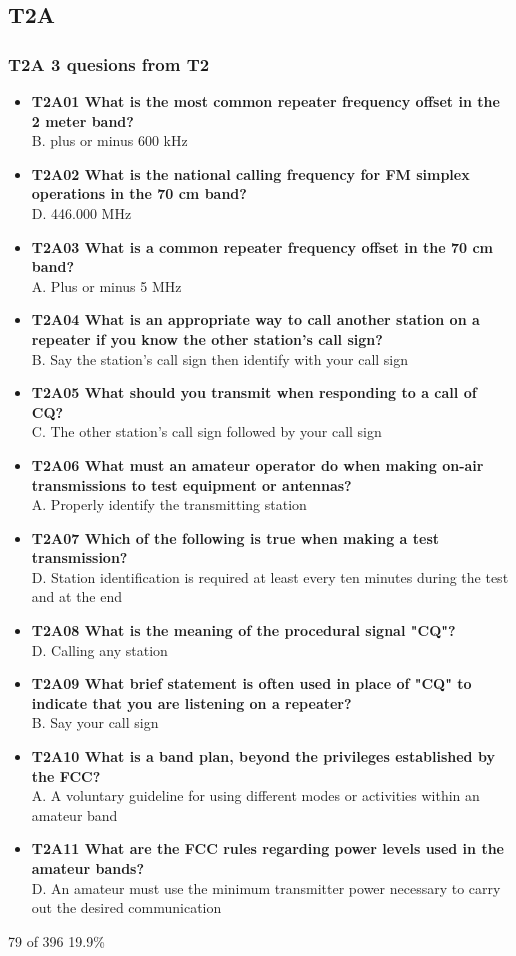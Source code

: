 \documentclass[10pt]{beamer}
\begin{document}
\subsection{T2A}
\begin{frame}
\frametitle{T2A 3 quesions from T2}
\begin{itemize}[<+->]
\tiny
\item\textbf{T2A01 What is the most common repeater frequency offset in the 2 meter band?}\\ B. plus or minus 600 kHz
\item\textbf{T2A02 What is the national calling frequency for FM simplex operations in the 70 cm band?}\\ D. 446.000 MHz
\item\textbf{T2A03 What is a common repeater frequency offset in the 70 cm band?}\\ A. Plus or minus 5 MHz
\item\textbf{T2A04 What is an appropriate way to call another station on a repeater if you know the other station's call sign?}\\ B. Say the station's call sign then identify with your call sign
\item\textbf{T2A05 What should you transmit when responding to a call of CQ?}\\ C. The other station's call sign followed by your call sign
\item\textbf{T2A06 What must an amateur operator do when making on-air transmissions to test equipment or antennas?}\\ A. Properly identify the transmitting station
\item\textbf{T2A07 Which of the following is true when making a test transmission?}\\ D. Station identification is required at least every ten minutes during the test and at the end
\item\textbf{T2A08 What is the meaning of the procedural signal "CQ"?}\\ D. Calling any station
\item\textbf{T2A09 What brief statement is often used in place of "CQ" to indicate that you are listening on a repeater?}\\ B. Say your call sign
\item\textbf{T2A10 What is a band plan, beyond the privileges established by the FCC?}\\ A. A voluntary guideline for using different modes or activities within an amateur band
\item\textbf{T2A11 What are the FCC rules regarding power levels used in the amateur bands?}\\ D. An amateur must use the minimum transmitter power necessary to carry out the desired communication
\end{itemize}
\tiny 79 of 396 19.9\%
\end{frame}
\end{document}
